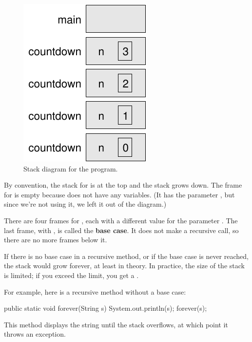 \begin{figure}[!ht]
\begin{center}
\includegraphics{figs/stack2.pdf}
\caption{Stack diagram for the  program.}
\label{fig.stack2}
\end{center}
\end{figure}

By convention, the stack for  is at the top and the stack grows down.
The frame for  is empty because  does not have any variables.
(It has the parameter , but since we're not using it, we left it out of the diagram.)


There are four frames for , each with a different value for the parameter .
The last frame, with , is called the {\bf base case}.
It does not make a recursive call, so there are no more frames below it.

If there is no base case in a recursive method, or if the base case is never reached, the stack would grow forever, at least in theory.
In practice, the size of the stack is limited; if you exceed the limit, you get a .

For example, here is a recursive method without a base case:

\begin{code}
public static void forever(String s) {
    System.out.println(s);
    forever(s);
}
\end{code}


This method displays the string until the stack overflows, at which point it throws an exception.


